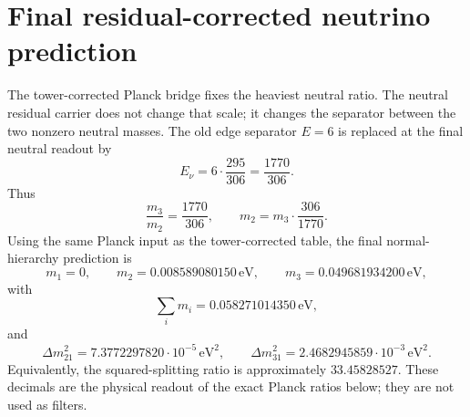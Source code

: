 \documentclass[11pt]{article}
\begin{document}
\section{Final residual-corrected neutrino prediction}

The tower-corrected Planck bridge fixes the heaviest neutral ratio.  The
neutral residual carrier does not change that scale; it changes the
separator between the two nonzero neutral masses.  The old edge separator
$E=6$ is replaced at the final neutral readout by
\[
  E_\nu = 6\cdot\frac{295}{306} = \frac{1770}{306}.
\]
Thus
\[
  \frac{m_3}{m_2}=\frac{1770}{306},\qquad
  m_2 = m_3\cdot\frac{306}{1770}.
\]
Using the same Planck input as the tower-corrected table, the final
normal-hierarchy prediction is
\[
  m_1 = 0,
  \qquad m_2 = 0.008589080150\,\mathrm{eV},
  \qquad m_3 = 0.049681934200\,\mathrm{eV},
\]
with
\[
  \sum_i m_i = 0.058271014350\,\mathrm{eV},
\]
and
\[
  \Delta m^2_{21} = 7.3772297820\cdot10^{-5}\,\mathrm{eV}^2,
  \qquad
  \Delta m^2_{31} = 2.4682945859\cdot10^{-3}\,\mathrm{eV}^2.
\]
Equivalently, the squared-splitting ratio is approximately
$33.45828527$.  These decimals are the physical readout of the exact
Planck ratios below; they are not used as filters.
\end{document}

